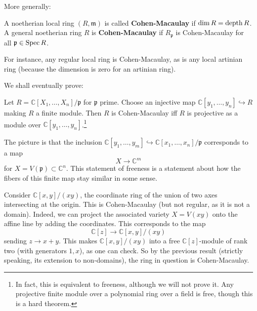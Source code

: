 More generally:
\begin{definition}
A noetherian local ring $(R, \mathfrak{m})$ is called
\textbf{Cohen-Macaulay}
if $\dim R = \operatorname{depth} R$. A general noetherian ring $R$ is
\textbf{Cohen-Macaulay} if
$R_{\mathfrak{p}}$ is Cohen-Macaulay for all $\mathfrak{p} \in
\operatorname{Spec} R$.
\end{definition}
For instance, any regular local ring is Cohen-Macaulay, as is
any local
artinian ring (because the dimension is zero for an artinian
ring).

We shall eventually prove:

\begin{proposition}
Let $R = \mathbb{C}[X_1, \dots, X_n]/\mathfrak{p}$ for
$\mathfrak{p}$ prime.
Choose an injective map $\mathbb{C}[y_1, \dots, y_n]
\hookrightarrow R$ making $R$ a
finite module. Then $R$ is Cohen-Macaulay iff $R$ is projective
as a module
over $\mathbb{C}[y_1, \dots, y_n]$.\footnote{In fact, this is
equivalent to
freeness, although we will not prove it. Any projective finite
module over a
polynomial ring over a field is free, though this is a hard
theorem.}
\end{proposition}

The picture is that the inclusion $\mathbb{C}[y_1, \dots, y_m ]
\hookrightarrow
\mathbb{C}[x_1, \dots, x_n]/\mathfrak{p}$ corresponds to a map
\[ X \to \mathbb{C}^m  \]
for $X = V(\mathfrak{p}) \subset \mathbb{C}^n$. This statement
of freeness is a
statement about how the fibers of this finite map stay similar
in some sense.

\begin{example}
Consider $\mathbb{C}[x,y]/(xy)$, the coordinate ring of the
union of two axes
intersecting at the origin. This is Cohen-Macaulay (but not
regular, as it
is not a domain). Indeed, we can project the associated variety
$X = V(xy)$
onto the affine line by adding the coordinates. This corresponds
to the map
\[ \mathbb{C}[z] \to \mathbb{C}[x,y]/(xy)  \]
sending $z \to x+y$. This makes $\mathbb{C}[x,y]/(xy)$ into a
free
$\mathbb{C}[z]$-module of rank two (with generators $1, x$), as
one can check.
So by the previous result (strictly speaking, its extension to
non-domains),
the ring in question is Cohen-Macaulay.
\end{example}


